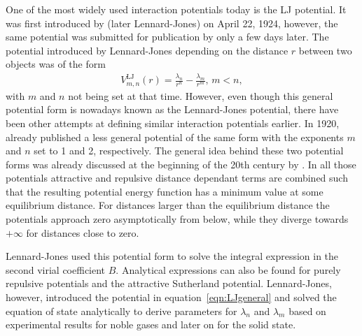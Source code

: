 One of the most widely used interaction potentials today is the \ac{LJ}
potential. It was first introduced by
\citeauthor{Jones_DeterminationMolecularFields_1924} (later Lennard-Jones) on
April 22, 1924\autocite{Jones_DeterminationMolecularFields_1924}, however, the
same potential was submitted for publication by
\citeauthor{Simon_KristallstrukturArgons_1924} only a few days
later.\autocite{Simon_KristallstrukturArgons_1924} The potential introduced by
Lennard-Jones depending on the distance $r$ between two objects was of the form
%
\begin{align}
    V_{m,n}^\text{LJ}(r)=\frac{\lambda_n}{r^n}-\frac{\lambda_m}{r^m},\, m<n,\label{eqn:LJgeneral}
\end{align}
%
with $m$ and $n$ not being set at that time. However, even though this general
potential form is nowadays known as the Lennard-Jones potential, there have
been other attempts at defining similar interaction
potentials earlier. In 1920,
\citeauthor{Kratzer_ultrarotenRotationsspektrenHalogenwasserstoffe_1920}\autocite{Kratzer_ultrarotenRotationsspektrenHalogenwasserstoffe_1920}
already published a less general potential of the same form with the exponents
$m$ and $n$ set to 1 and 2, respectively. The general idea behind these two
potential forms was already discussed at the beginning of the 20th century by
\citeauthor{Mie_ZurkinetischenTheorie_1903}\autocite{Mie_ZurkinetischenTheorie_1903}.
In all those potentials attractive and repulsive distance dependant terms are
combined such that the resulting potential energy function has a minimum value
at some equilibrium distance. For distances larger than the equilibrium
distance the potentials approach zero asymptotically from below, while they
diverge towards $+\infty$ for distances close to zero.

Lennard-Jones used this potential form to solve the integral expression in the
second virial coefficient $B$. Analytical expressions can also be found for
purely repulsive potentials and the attractive Sutherland potential.
Lennard-Jones, however, introduced the potential in
equation~\ref{eqn:LJgeneral} and solved the equation of state analytically to
derive parameters for $\lambda_n$ and $\lambda_m$ based on experimental results
for noble gases\autocite{Jones_DeterminationMolecularFields_1924} and later on
for the solid state.\autocite{Jones_calculationcertaincrystal_1925}


